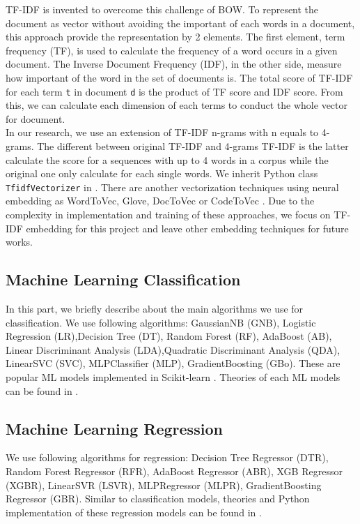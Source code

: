 TF-IDF \cite{008} is invented to overcome this challenge of BOW. To represent the document as vector without avoiding the important of each words in a document, this approach provide the representation by 2 elements. The first element, term frequency (TF), is used to calculate the frequency of a word occurs in a given document. The Inverse Document Frequency (IDF), in the other side, measure how important of the word in the set of documents is. The total score of TF-IDF for each term \texttt{t} in document \texttt{d} is the product of TF score and IDF score. From this, we can calculate each dimension of each terms to conduct the whole vector for document.
\\
In our research, we use an extension of TF-IDF n-grams with n equals to 4-grams. The different between original TF-IDF and 4-grams TF-IDF is the latter calculate the score for a sequences with up to 4 words in a corpus while the original one only calculate for each single words. We inherit Python class \texttt{TfidfVectorizer} in \cite{009}. There are another vectorization techniques using neural embedding as WordToVec, Glove, DocToVec or CodeToVec \cite{013}. Due to the complexity in implementation and training of these approaches, we focus on TF-IDF embedding for this project and leave other embedding techniques for future works.


\subsection{Machine Learning Classification}
In this part, we briefly describe about the main algorithms we use for classification. We use following algorithms: GaussianNB (GNB), Logistic Regression (LR),Decision Tree (DT),
Random Forest (RF), AdaBoost (AB), Linear Discriminant Analysis (LDA),Quadratic Discriminant Analysis (QDA),
LinearSVC (SVC), MLPClassifier (MLP), GradientBoosting (GBo). These are popular ML models implemented in Scikit-learn \cite{010}. Theories of each ML models can be found in \cite{011,012}. 


\subsection{Machine Learning Regression}
We use following algorithms for regression: Decision Tree Regressor (DTR), Random Forest Regressor (RFR), AdaBoost Regressor (ABR),
XGB Regressor (XGBR),
LinearSVR (LSVR), MLPRegressor (MLPR), GradientBoosting Regressor (GBR). Similar to classification models, theories and Python implementation of these regression models can be found in \cite{010,011,012}.


